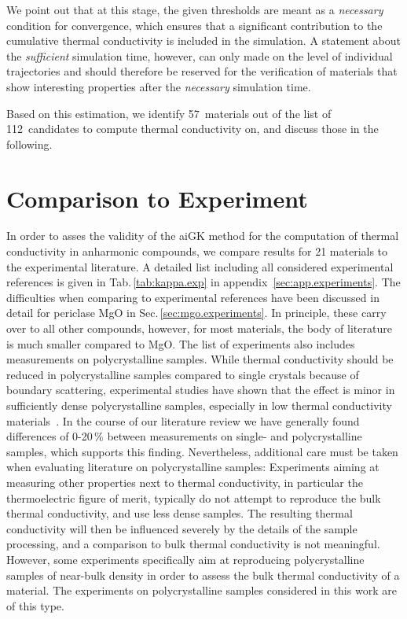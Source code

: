 %
We point out that at this stage, the given thresholds are meant as a \emph{necessary} condition for convergence, which ensures that a significant contribution to the cumulative thermal conductivity is included in the simulation. A statement about the \emph{sufficient} simulation time, however, can only made on the level of individual trajectories and should therefore be reserved for the verification of materials that show interesting properties after the \emph{necessary} simulation time.

Based on this estimation, we identify  57~materials out of the list of  112~candidates to compute thermal conductivity on, and discuss those in the following.



\section{Comparison to Experiment}
\label{sec:results.experiments}
In order to asses the validity of the aiGK method for the computation of thermal conductivity in anharmonic compounds, we compare results for 21 materials to the experimental literature. A detailed list including all considered experimental references is given in Tab.\,\ref{tab:kappa.exp} in appendix~\ref{sec:app.experiments}. The difficulties when comparing to experimental references have been discussed in detail for periclase MgO in Sec.\,\ref{sec:mgo.experiments}. In principle, these carry over to all other compounds, however, for most materials, the body of literature is much smaller compared to MgO. The list of experiments also includes measurements on polycrystalline samples. While thermal conductivity should be reduced in polycrystalline samples compared to single crystals because of boundary scattering, experimental studies have shown that the effect is minor in sufficiently dense polycrystalline samples, especially in low thermal conductivity materials~\cite{charvat1957}. In the course of our literature review we have generally found differences of 0-20\,\% between measurements on single- and polycrystalline samples, which supports this finding. Nevertheless, additional care must be taken when evaluating literature on polycrystalline samples: Experiments aiming at measuring other properties next to thermal conductivity, in particular the thermoelectric figure of merit, typically do not attempt to reproduce the bulk thermal conductivity, and use less dense samples. The resulting thermal conductivity will then be influenced severely by the details of the sample processing, and a comparison to bulk thermal conductivity is not meaningful. However, some experiments specifically aim at reproducing polycrystalline samples of near-bulk density in order to assess the bulk thermal conductivity of a material. The experiments on polycrystalline samples considered in this work are of this type.

